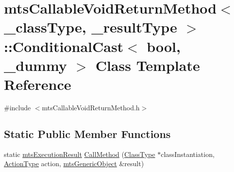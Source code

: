 \hypertarget{classmts_callable_void_return_method_1_1_conditional_cast}{\section{mts\-Callable\-Void\-Return\-Method$<$ \-\_\-class\-Type, \-\_\-result\-Type $>$\-:\-:Conditional\-Cast$<$ bool, \-\_\-dummy $>$ Class Template Reference}
\label{classmts_callable_void_return_method_1_1_conditional_cast}
}


{\ttfamily \#include $<$mts\-Callable\-Void\-Return\-Method.\-h$>$}

\subsection*{Static Public Member Functions}
\begin{DoxyCompactItemize}
\item 
static \hyperlink{classmts_execution_result}{mts\-Execution\-Result} \hyperlink{classmts_callable_void_return_method_1_1_conditional_cast_a3b9e211ba1cf2392b29f29244fbeb95b}{Call\-Method} (\hyperlink{classmts_callable_void_return_method_a2bea77e5dd239ec2a1d3558dd3ca1776}{Class\-Type} $\ast$class\-Instantiation, \hyperlink{classmts_callable_void_return_method_a7f1f533b8d1e55b4b35d03dc80017101}{Action\-Type} action, \hyperlink{classmts_generic_object}{mts\-Generic\-Object} \&result)
\end{DoxyCompactItemize}



